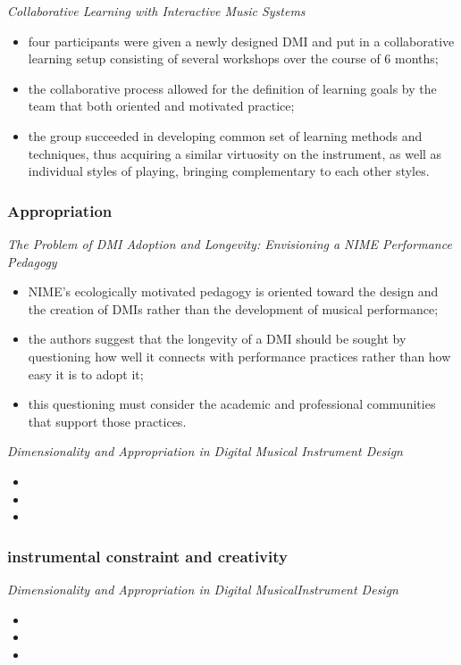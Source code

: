 \documentclass[11pt]{article}
\begin{document}
\textit{Collaborative Learning with Interactive Music Systems} \citep{marquez-borbon_collaborative_2020}
\begin{itemize}
    \item four participants were given a newly designed DMI and put in a collaborative learning setup consisting of several workshops over the course of 6 months;
    \item the collaborative process allowed for the definition of learning goals by the team that both oriented and motivated practice;
    \item the group succeeded in developing common set of learning methods and techniques, thus acquiring a similar virtuosity on the instrument, as well as individual styles of playing, bringing complementary to each other styles.
\end{itemize}


\subsubsection{Appropriation}
\textit{The Problem of DMI Adoption and Longevity: Envisioning a NIME Performance Pedagogy} \citep{marquez-borbon_problem_2018}
\begin{itemize}
    \item NIME's ecologically motivated pedagogy is oriented toward the design and the creation of DMIs rather than the development of musical performance;
    \item the authors suggest that the longevity of a DMI should be sought by questioning how well it connects with performance practices rather than how easy it is to adopt it;
    \item this questioning must consider the academic and professional communities that support those practices.
\end{itemize}

\textit{Dimensionality and Appropriation in Digital Musical Instrument Design} \citep{zappi_dimensionality_2014}
\begin{itemize}
    \item 
    \item 
    \item 
\end{itemize}


\subsubsection{instrumental constraint and creativity}
\textit{Dimensionality and Appropriation in Digital MusicalInstrument Design} \citep{zappi_dimensionality_2014}
\begin{itemize}
    \item 
    \item 
    \item 
\end{itemize}
\end{document}

